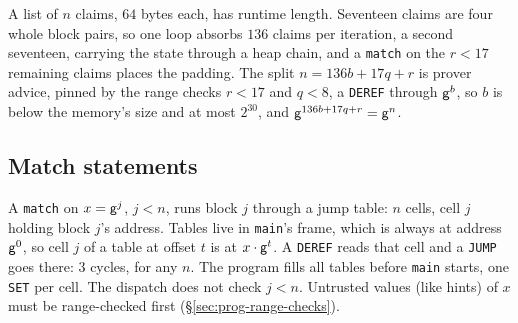 A list of $n$ claims, $64$ bytes each, has runtime length. Seventeen claims are four whole block pairs, so one loop absorbs $136$ claims per iteration, a second seventeen, carrying the state through a heap chain, and a \texttt{match} on the $r<17$ remaining claims places the padding. The split $n=136b+17q+r$ is prover advice, pinned by the range checks $r<17$ and $q<8$, a \texttt{DEREF} through $\mathsf{g}^{b}$, so $b$ is below the memory's size and at most $2^{30}$, and $\mathsf{g}^{136b+17q+r}=\mathsf{g}^{n}$.

\subsection{Match statements}\label{sec:prog-match}

A \texttt{match} on $x=\mathsf{g}^{j}$, $j<n$, runs block $j$ through a jump table: $n$ cells, cell $j$ holding block $j$'s address. Tables live in \texttt{main}'s frame, which is always at address $\mathsf{g}^{0}$, so cell $j$ of a table at offset $t$ is at $x\cdot\mathsf{g}^{t}$. A \texttt{DEREF} reads that cell and a \texttt{JUMP} goes there: 3 cycles, for any $n$. The program fills all tables before \texttt{main} starts, one \texttt{SET} per cell. The dispatch does not check $j<n$. Untrusted values (like hints) of $x$ must be range-checked first (\S\ref{sec:prog-range-checks}).

